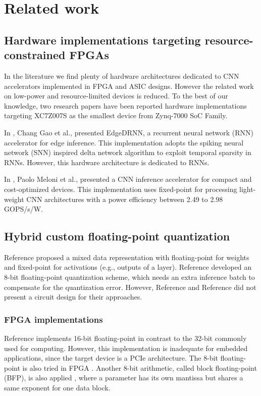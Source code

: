 \section{Related work}
\label{sec:related_work}
\subsection{Hardware implementations targeting resource-constrained FPGAs}
In the literature we find plenty of hardware architectures
dedicated to CNN accelerators implemented in FPGA and ASIC designs. However the related work on low-power and resource-limited devices is reduced. To the best of our knowledge, two research papers have been reported hardware implementations targeting XC7Z007S as the smallest device from Zynq-7000 SoC Family.

In \cite{gao2020edgedrnn}, Chang Gao et al., presented EdgeDRNN, a recurrent neural network (RNN) accelerator for edge inference. This implementation adopts the spiking neural network (SNN) inspired delta network algorithm to exploit temporal sparsity in RNNs. However, this hardware architecture is dedicated to RNNs.

In \cite{meloni2019cnn}, Paolo Meloni et al., presented a CNN inference accelerator for compact and cost-optimized devices. This implementation uses fixed-point for processing light-weight CNN architectures with a power efficiency between 2.49 to 2.98 GOPS/s/W.

\subsection{Hybrid custom floating-point quantization}
Reference \mbox{\cite{lai2017deep}} proposed a mixed data representation with floating-point for weights and fixed-point for activations (e.g., outputs of a layer). Reference \mbox{\cite{settle2018quantizing}} developed an 8-bit floating-point quantization scheme, which needs an extra inference batch to compensate for the quantization error. However, Reference \mbox{\cite{lai2017deep}} and Reference \mbox{\cite{settle2018quantizing}} did not present a circuit design for their approaches.

\subsubsection{FPGA implementations}
Reference \mbox{\cite{mei2017200mhz}} implements 16-bit floating-point in contrast to the 32-bit commonly used for computing. However, this implementation is inadequate for embedded applications, since the target device is a PCIe architecture. The 8-bit floating-point is also tried in FPGA \mbox{\cite{wu2021low}}. Another 8-bit arithmetic, called block floating-point (BFP), is also applied \mbox{\cite{lian2019high}}, where a parameter has its own mantissa but shares a same exponent for one data block.
